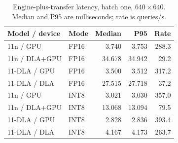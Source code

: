 \begin{table}[t]
\caption{Engine-plus-transfer latency, batch one, $640\times640$. Median and P95 are milliseconds; rate is queries/s.}
\label{tab:engine}\centering\footnotesize
\setlength{\tabcolsep}{3pt}
\begin{tabular*}{\columnwidth}{@{\extracolsep{\fill}}llrrr@{}}
\toprule
Model / device & Mode & Median & P95 & Rate \\
\midrule
11n / GPU & FP16 & 3.740 & 3.753 & 288.3 \\
11n / DLA+GPU & FP16 & 34.678 & 34.942 & 29.2 \\
11-DLA / GPU & FP16 & 3.500 & 3.512 & 317.2 \\
11-DLA / DLA & FP16 & 27.515 & 27.718 & 37.2 \\
\midrule
11n / GPU & INT8 & 3.021 & 3.030 & 357.0 \\
11n / DLA+GPU & INT8 & 13.068 & 13.094 & 79.5 \\
11-DLA / GPU & INT8 & 2.828 & 2.836 & 393.4 \\
11-DLA / DLA & INT8 & 4.167 & 4.173 & 263.7 \\
\bottomrule
\end{tabular*}
\end{table}

